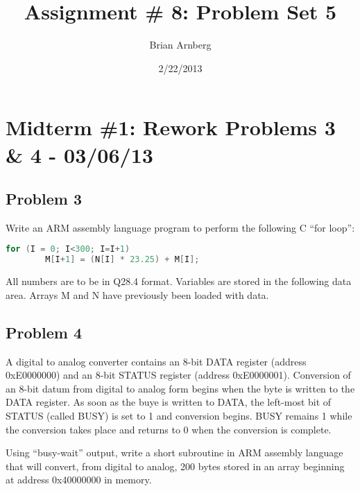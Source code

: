 \documentclass{article}
\title{Assignment \# 8: Problem Set 5}
\date{2/22/2013}
\author{Brian Arnberg}
\begin{document}
\label{start}



\section*{Midterm \#1: Rework Problems 3 \& 4 - 03/06/13}
\subsection*{Problem 3}
Write an ARM assembly language program to perform the following C ``for loop'':
\begin{lstlisting}[language=C, frame=none, numbers=none ]
	for (I = 0; I<300; I=I+1)
		M[I+1] = (N[I] * 23.25) + M[I];
\end{lstlisting}

All numbers are to be in Q28.4 format. Variables are stored in the following data area. Arrays M and N have previously been loaded with data.


\newpage
\subsection*{Problem 4}
A digital to analog converter contains an 8-bit DATA register (address 0xE0000000) and an 8-bit STATUS register (address 0xE0000001). Conversion of an 8-bit datum from digital to analog form begins when the byte is written to the DATA register. As soon as the buye is written to DATA, the left-most bit of STATUS (called BUSY) is set to 1 and conversion begins. BUSY remains 1 while the conversion takes place and returns to 0 when the conversion is complete.

Using ``busy-wait'' output, write a short subroutine in ARM assembly language that will convert, from digital to analog, 200 bytes stored in an array beginning at address 0x40000000 in memory. 



\label{end}
\end{document}
